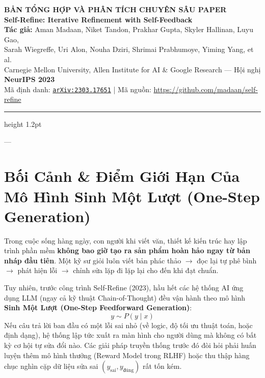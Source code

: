 \documentclass[11pt,a4paper]{article}
\begin{document}
\begin{center}
    {\Large\bfseries BẢN TỔNG HỢP VÀ PHÂN TÍCH CHUYÊN SÂU PAPER}\\[0.3cm]
    {\LARGE\bfseries Self-Refine: Iterative Refinement with Self-Feedback}\\[0.4cm]
    {\normalsize\textbf{Tác giả:} Aman Madaan, Niket Tandon, Prakhar Gupta, Skyler Hallinan, Luyu Gao,}\\
    {\normalsize Sarah Wiegreffe, Uri Alon, Nouha Dziri, Shrimai Prabhumoye, Yiming Yang, et al.}\\[0.15cm]
    {\small Carnegie Mellon University, Allen Institute for AI \& Google Research — Hội nghị \textbf{NeurIPS 2023}}\\[0.15cm]
    {\small Mã định danh: \href{https://arxiv.org/abs/2303.17651}{\texttt{arXiv:2303.17651}} \quad | \quad Mã nguồn: \url{https://github.com/madaan/self-refine}}
\end{center}

\vspace{0.3cm}
\hrule height 1.2pt
\vspace{0.6cm}

---

\section{Bối Cảnh \& Điểm Giới Hạn Của Mô Hình Sinh Một Lượt (One-Step Generation)}

Trong cuộc sống hàng ngày, con người khi viết văn, thiết kế kiến trúc hay lập trình phần mềm \textbf{không bao giờ tạo ra sản phẩm hoàn hảo ngay từ bản nháp đầu tiên}. Một kỹ sư giỏi luôn viết bản phác thảo $\rightarrow$ đọc lại tự phê bình $\rightarrow$ phát hiện lỗi $\rightarrow$ chỉnh sửa lặp đi lặp lại cho đến khi đạt chuẩn.

Tuy nhiên, trước công trình Self-Refine (2023), hầu hết các hệ thống AI ứng dụng LLM (ngay cả kỹ thuật Chain-of-Thought) đều vận hành theo mô hình \textbf{Sinh Một Lượt (One-Step Feedforward Generation)}:
\begin{equation}
    y \sim P(y \mid x)
\end{equation}
Nếu câu trả lời ban đầu có một lỗi sai nhỏ (về logic, độ tối ưu thuật toán, hoặc định dạng), hệ thống lập tức xuất ra màn hình cho người dùng mà không có bất kỳ cơ hội tự sửa đổi nào. Các giải pháp truyền thống trước đó đòi hỏi phải huấn luyện thêm mô hình thưởng (Reward Model trong RLHF) hoặc thu thập hàng chục nghìn cặp dữ liệu sửa sai $(y_{\text{sai}}, y_{\text{đúng}})$ rất tốn kém.
\end{document}
